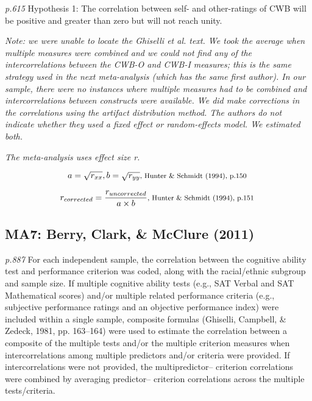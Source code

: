 \documentclass{article}
\begin{document}
\textit{p.615} Hypothesis 1: The correlation between self- and other-ratings of CWB will be positive and greater than zero but will not reach unity.

\vspace{3 mm}
\textit{Note: we were unable to locate the Ghiselli et al. text. We took the average when multiple measures were combined and we could not find any of the intercorrelations between the CWB-O and CWB-I measures; this is the same strategy used in the next meta-analysis (which has the same first author). In our sample, there were no instances where multiple measures had to be combined and intercorrelations between constructs were available. We did make corrections in the correlations using the artifact distribution method. The authors do not indicate whether they used a fixed effect or random-effects model. We estimated both. }

\vspace{3mm}
\textit{The meta-analysis uses effect size r.}

\begin{equation*}
a = \sqrt{r_{xx}}, b = \sqrt{r_{yy}} \mbox{\footnotesize, Hunter \& Schmidt (1994), p.150 } 
\end{equation*}

\begin{equation*}
r_{corrected} =\frac{ r_{uncorrected}}{a \times b} \mbox{\footnotesize, Hunter \& Schmidt (1994), p.151 } 
\end{equation*}

\subsection*{MA7: Berry, Clark, \& McClure (2011)}

\textit{p.887} For each independent sample, the correlation between the cognitive ability test and performance criterion was coded, along with the racial/ethnic subgroup and sample size. If multiple cognitive ability tests (e.g., SAT Verbal and SAT Mathematical scores) and/or multiple related performance criteria (e.g., subjective performance ratings and an objective performance index) were included within a single sample, composite formulas (Ghiselli, Campbell, \& Zedeck, 1981, pp. 163–164) were used to estimate the correlation between a composite of the multiple tests and/or the multiple criterion measures when intercorrelations among multiple predictors and/or criteria were provided. If intercorrelations were not provided, the multipredictor– criterion correlations were combined by averaging predictor– criterion correlations across the multiple tests/criteria.
\end{document}
